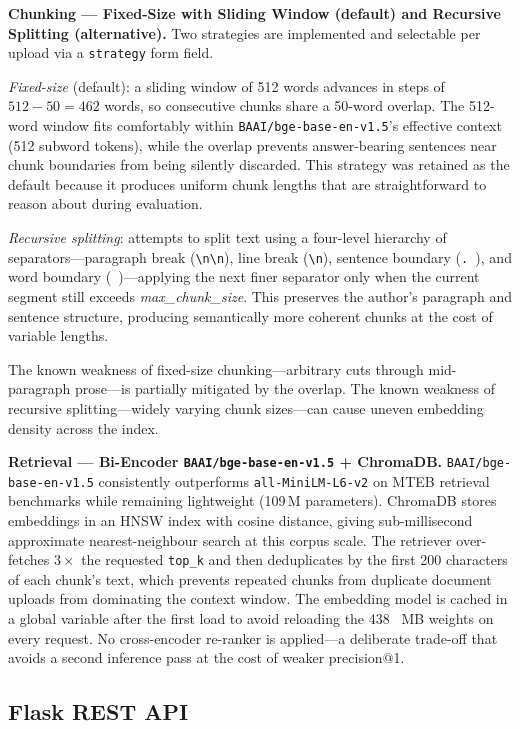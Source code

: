 \documentclass[10pt]{article}
\begin{document}
\textbf{Chunking — Fixed-Size with Sliding Window (default) and Recursive
Splitting (alternative).}
Two strategies are implemented and selectable per upload via a \texttt{strategy}
form field.

\textit{Fixed-size} (default): a sliding window of 512 words advances in steps
of $512 - 50 = 462$ words, so consecutive chunks share a 50-word overlap.
The 512-word window fits comfortably within \texttt{BAAI/bge-base-en-v1.5}'s
effective context (512 subword tokens), while the overlap prevents
answer-bearing sentences near chunk boundaries from being silently discarded.
This strategy was retained as the default because it produces uniform chunk
lengths that are straightforward to reason about during evaluation.


\textit{Recursive splitting}: attempts to split text using a four-level
hierarchy of separators---paragraph break (\verb|\n\n|),
line break (\verb|\n|), sentence boundary (\verb|. |),
and word boundary (\verb| |)---applying the next finer separator only
when the current segment still exceeds \textit{max\_chunk\_size}.
This preserves the author's paragraph and sentence structure,
producing semantically more coherent chunks at the cost of variable lengths.

The known weakness of fixed-size chunking---arbitrary cuts through
mid-paragraph prose---is partially mitigated by the overlap.
The known weakness of recursive splitting---widely varying chunk sizes---can
cause uneven embedding density across the index.


\textbf{Retrieval — Bi-Encoder \texttt{BAAI/bge-base-en-v1.5} + ChromaDB.}
\texttt{BAAI/bge-base-en-v1.5} consistently outperforms
\texttt{all-MiniLM-L6-v2} on MTEB retrieval benchmarks while remaining
lightweight (109\,M parameters).
ChromaDB stores embeddings in an HNSW index with cosine distance, giving
sub-millisecond approximate nearest-neighbour search at this corpus scale.
The retriever over-fetches $3\times$ the requested \texttt{top\_k} and then
deduplicates by the first 200 characters of each chunk's text, which prevents
repeated chunks from duplicate document uploads from dominating the context
window.
The embedding model is cached in a global variable after the first load to avoid
reloading the 438 \, MB weights on every request.
No cross-encoder re-ranker is applied---a deliberate trade-off that avoids a
second inference pass at the cost of weaker precision@1.

\subsection{Flask REST API}
\end{document}
